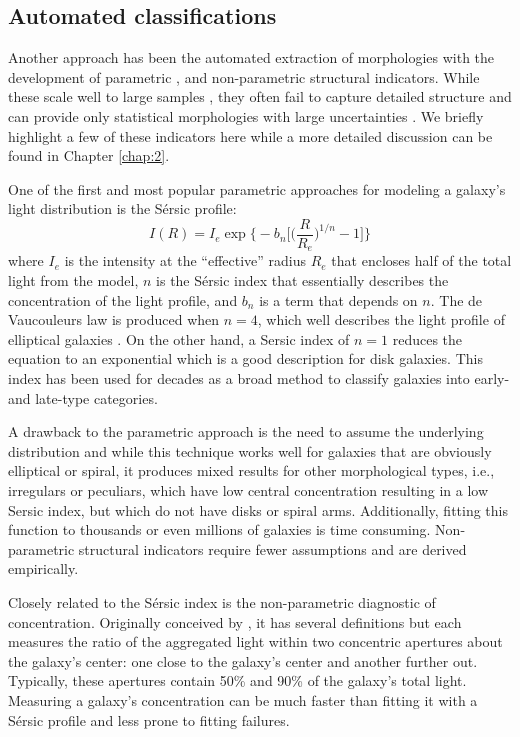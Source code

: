 \subsection{Automated classifications}
Another approach has been the automated extraction of morphologies with the development of parametric \citep{Sersic1968, Odewahn2002, Peng2002}, and non-parametric 
\citep{Abraham1994, 
	   Conselice2003, 
	   Abraham2003, 
	   Lotz2004,  
	   Freeman2013} 
structural indicators. While these scale well to large samples 
\citep[e.g.,][]{Simard2011, 
			Griffith2012, 
			Casteels2014, 
			Holwerda2014, 
			Meert2016}, 
they often fail to capture detailed structure and can provide only statistical morphologies with large uncertainties \cite[e.g.,][]{Abraham1996, Bershady2000}. We briefly highlight a few of these indicators here while a more detailed discussion can be found in Chapter \ref{chap:2}. 

One of the first and most popular parametric approaches for modeling a galaxy's light distribution is the S\'ersic profile:
\begin{equation}
I(R) = I_e \exp \Big\{-b_n\Big[\Big(\frac{R}{R_e}\Big)^{1/n}-1\Big]\Big\}
\end{equation}
where $I_e$ is the intensity at the ``effective'' radius $R_e$ that encloses half of the total light from the model, $n$ is the S\'ersic index that essentially describes the concentration of the light profile, and $b_n$ is a term that depends on $n$. The de Vaucouleurs law is produced when $n=4$, which well describes the light profile of elliptical galaxies \citep{deVaucouleurs1948}. On the other hand, a Sersic index of $n=1$ reduces the equation to an exponential which is a good description for disk galaxies. This index has been used for decades as a broad method to classify galaxies into early- and late-type categories. 

A drawback to the parametric approach is the need to assume the underlying distribution and while this technique works well for galaxies that are obviously elliptical or spiral, it produces mixed results for other morphological types, i.e., irregulars or peculiars, which have low central concentration resulting in a low Sersic index, but which do not have disks or spiral arms. Additionally, fitting this function to thousands or even millions of galaxies is time consuming. Non-parametric structural indicators require fewer assumptions and are derived empirically.

Closely related to the S\'ersic index is the non-parametric diagnostic of concentration. Originally conceived by \cite{Abraham1996}, it has several definitions but each measures the ratio of the aggregated light within two concentric apertures about the galaxy's center: one close to the galaxy's center and another further out. Typically, these apertures contain 50\% and 90\% of the galaxy's total light. Measuring a galaxy's concentration can be much faster than fitting it with a S\'ersic profile and less prone to fitting failures. 

